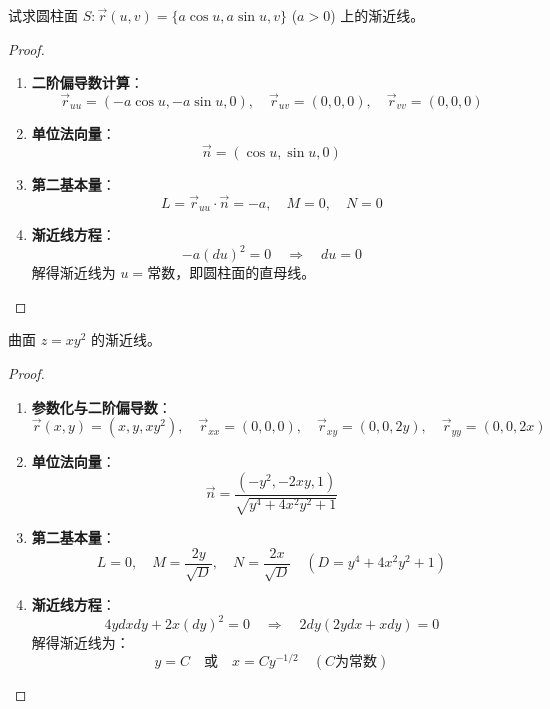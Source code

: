 \documentclass[lang=cn,10pt,thmcnt=section]{elegantbook}
\begin{document}
\begin{example}
	试求圆柱面 $S: \vec{r}(u,v) = \{a\cos u, a\sin u, v\}$ ($a > 0$) 上的渐近线。
\end{example}
\begin{proof}
	\begin{enumerate}
		\item \textbf{二阶偏导数计算}：
		\[
			\vec{r}_{uu} = (-a\cos u, -a\sin u, 0), \quad 
			\vec{r}_{uv} = (0,0,0), \quad 
			\vec{r}_{vv} = (0,0,0)
		\]
		
		\item \textbf{单位法向量}：
		\[
			\vec{n} = (\cos u, \sin u, 0)
		\]
		
		\item \textbf{第二基本量}：
		\[
			L = \vec{r}_{uu} \cdot \vec{n} = -a, \quad 
			M = 0, \quad 
			N = 0
		\]
		
		\item \textbf{渐近线方程}：
		\[
			-a (du)^2 = 0 \quad \Rightarrow \quad du = 0
		\]
		解得渐近线为 $\boxed{u = \text{常数}}$，即圆柱面的直母线。
	\end{enumerate}
\end{proof}
\begin{example}
	曲面 $z = xy^2$ 的渐近线。
\end{example}
\begin{proof}
	\begin{enumerate}
		\item \textbf{参数化与二阶偏导数}：
		\[
			\vec{r}(x,y) = (x, y, xy^2), \quad 
			\vec{r}_{xx} = (0,0,0), \quad 
			\vec{r}_{xy} = (0,0,2y), \quad 
			\vec{r}_{yy} = (0,0,2x)
		\]
		
		\item \textbf{单位法向量}：
		\[
			\vec{n} = \frac{(-y^2, -2xy, 1)}{\sqrt{y^4 + 4x^2y^2 + 1}}
		\]
		
		\item \textbf{第二基本量}：
		\[
			L = 0, \quad 
			M = \frac{2y}{\sqrt{D}}, \quad 
			N = \frac{2x}{\sqrt{D}} \quad (D = y^4 + 4x^2y^2 + 1)
		\]
		
		\item \textbf{渐近线方程}：
		\[
			4y dx dy + 2x (dy)^2 = 0 \quad \Rightarrow \quad 2 dy (2y dx + x dy) = 0
		\]
		解得渐近线为：
		\[
			\boxed{y = C} \quad \text{或} \quad \boxed{x = Cy^{-1/2}} \quad (C \text{为常数})
		\]
	\end{enumerate}
\end{proof}
\end{document}
